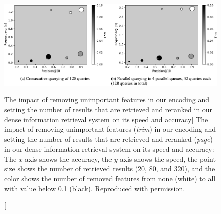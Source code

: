 \begin{figure}
\includegraphics{scaletext-speed}
\vspace{-0.5cm}
\caption
  [The impact of removing unimportant features in our encoding and setting the
   number of results that are retrieved and reranked in our dense information
   retrieval system on its speed and accuracy]%
  {The impact of removing unimportant features (\emph{trim}) in our encoding and
   setting the number of results that are retrieved and reranked (\emph{page}) in
   our dense information retrieval system on its speed and accuracy: The
   $x$-axis shows the accuracy, the $y$-axis shows the speed, the point size
   shows the number of retrieved results (20, 80, and 320), and the color shows
   the number of removed features from none (white) to all with value below 0.1
   (black).  Reproduced with permission. \cite[Figure 2]{rygl2017semantic}}
\label{fig:scaletext-speed}
\end{figure}
